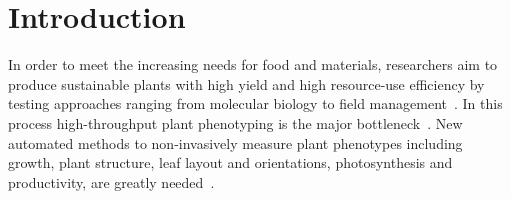 \section{Introduction}
\label{sec:intro}

In order to meet the increasing needs for food and materials, researchers aim to produce sustainable plants with high yield and high resource-use efficiency by testing approaches ranging from molecular biology to field management~\cite{walter2015plant1}. In this process high-throughput plant phenotyping is the major bottleneck~\cite{cobb2013next}. New automated methods to non-invasively measure plant phenotypes including growth, plant structure, leaf layout and orientations, photosynthesis and productivity, are greatly needed~\cite{leister1999large,muller2015leaf,walter2015plant1}. 


